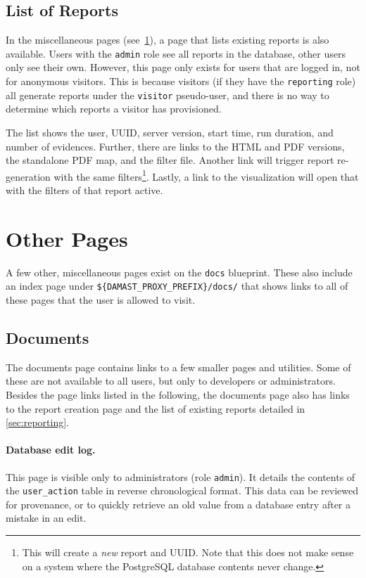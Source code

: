 \subsection{List of Reports}
\label{sec:report-list}

In the miscellaneous pages (see~\cref{sec:other-pages}), a page that lists existing reports is also available.
Users with the \verb!admin! role see all reports in the database, other users only see their own.
However, this page only exists for users that are logged in, not for anonymous visitors.
This is because visitors (if they have the \verb!reporting! role) all generate reports under the \verb!visitor! pseudo-user, and there is no way to determine which reports a visitor has provisioned.

The list shows the user, UUID, server version, start time, run duration, and number of evidences.
Further, there are links to the HTML and PDF versions, the standalone PDF map, and the filter file.
Another link will trigger report re-generation with the same filters\footnote{%
  This will create a \emph{new} report and UUID.
  Note that this does not make sense on a system where the PostgreSQL database contents never change.
  }.
Lastly, a link to the visualization will open that with the filters of that report active.


\section{Other Pages}
\label{sec:other-pages}

A few other, miscellaneous pages exist on the \verb!docs! blueprint.
These also include an index page under \verb!${DAMAST_PROXY_PREFIX}/docs/! that shows links to all of these pages that the user is allowed to visit.

\subsection{Documents}

The documents page contains links to a few smaller pages and utilities.
Some of these are not available to all users, but only to developers or administrators.
Besides the page links listed in the following, the documents page also has links to the report creation page and the list of existing reports detailed in \cref{sec:reporting}.

\paragraph*{Database edit log.}
This page is visible only to administrators (role \verb!admin!).
It details the contents of the \verb!user_action! table in reverse chronological format.
This data can be reviewed for provenance, or to quickly retrieve an old value from a database entry after a mistake in an edit.

